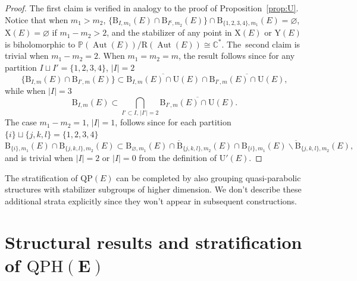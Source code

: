 \documentclass[10pt,a4paper]{amsart}
\newcommand{\field}[1]{\ensuremath{\mathbb{#1}}}
\newcommand{\CC}{\field{C}}
\newcommand{\PP}{\field{P}}
\DeclareMathOperator{\Aut}{Aut}
\numberwithin{equation}{section}
\begin{document}
\begin{proof}
The first claim is verified in analogy to the proof of Proposition~\ref{prop:U}. Notice that when $m_{1}>m_{2}$, $\{\mathrm{B}_{I,m_{1}}(E)\cap\mathrm{B}_{I^{\mathsf{c}},m_{2}}(E)\} \cap\mathrm{B}_{\{1,2,3,4\},m_{1}}(E)=\varnothing $, $\mathrm{X}(E)=\varnothing $ if $m_{1}-m_{2}> 2$, and the stabilizer of any point in $\mathrm{X}(E)$ or $\mathrm{Y}(E)$ is biholomorphic to $\PP(\Aut(E))/\mathrm{R}(\Aut(E))\cong\CC^{*}$. The~second claim is trivial when $m_{1}-m_{2}=2$. When $m_{1}=m_{2}=m$, the result follows since for any partition $I\sqcup I' =\{1,2,3,4\}$, $\vert I\vert =2$
\[
\bigl\{\mathrm{B}_{I,m}(E)\cap\mathrm{B}_{I',m}(E)\bigr\} \subset \overline{\mathrm{B}_{I,m}(E)\cap\mathrm{U}(E)}\cap\overline{\mathrm{B}_{I',m}(E)\cap\mathrm{U}(E)},
\]
while when $\vert I\vert = 3$
\[
\mathrm{B}_{I,m}(E) \subset \bigcap_{I'\subset I,\, \vert I'\vert = 2}\overline{\mathrm{B}_{I',m}(E)\cap\mathrm{U}(E)}.
\]
The case $m_{1}-m_{2} =1$, $\vert I\vert =1$, follows since for each partition $\{i\}\sqcup\{j,k,l\} = \{1,2,3,4\}$
\[
\mathrm{B}_{\{i\},m_{1}}(E)\cap\mathrm{B}_{\{j,k,l\},m_{2}}(E) \subset \overline{\mathrm{B}_{\varnothing ,m_{1}}(E)\cap\mathrm{B}_{\{j,k,l\},m_{2}}(E)} \cap \overline{\mathrm{B}_{\{i\},m_{1}}(E)\backslash\mathrm{B}_{\{j,k,l\},m_{2}}(E)},
\]
and is trivial when $\vert I\vert =2$ or $\vert I \vert =0$ from the definition of $\mathrm{U}'(E)$.
\end{proof}

The stratification of $\mathrm{QP}(E)$ can be completed by also grouping quasi-parabolic structures with stabilizer subgroups of higher dimension. We don't describe these additional strata explicitly since they won't appear in subsequent constructions.


\section[Structural results and stratification of QPH(E)]
{Structural results and stratification of $\boldsymbol{\mathrm{QPH}(E)}$}\label{sec:struct}
\end{document}
